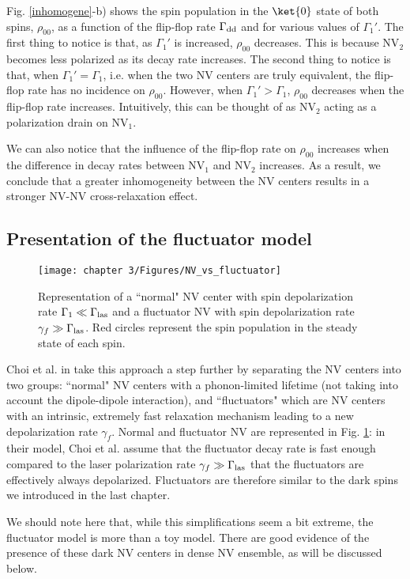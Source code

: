 \documentclass[a4paper, 11pt]{report}
\begin{document}
Fig. \ref{inhomogene}-b) shows the spin population in the $\ket{0}$ state of both spins, $\rho_{00}$, as a function of the flip-flop rate $\Gamma_{\rm dd}$ and for various values of $\Gamma_1'$. The first thing to notice is that, as $\Gamma_1'$ is increased, $\rho_{00}$ decreases. This is because NV$_2$ becomes less polarized as its decay rate increases. The second thing to notice is that, when $\Gamma_1'=\Gamma_1$, i.e. when the two NV centers are truly equivalent, the flip-flop rate has no incidence on $\rho_{00}$. However, when $\Gamma_1'>\Gamma_1$, $\rho_{00}$ decreases when the flip-flop rate increases. Intuitively, this can be thought of as NV$_2$ acting as a polarization drain on NV$_1$. 

We can also notice that the influence of the flip-flop rate on $\rho_{00}$ increases when the difference in decay rates between NV$_1$ and NV$_2$ increases. As a result, we conclude that a greater inhomogeneity between the NV centers results in a stronger NV-NV cross-relaxation effect.


\subsection{Presentation of the fluctuator model}
\begin{figure}[h]
\centering
\texttt{[image: chapter 3/Figures/NV\_vs\_fluctuator]}
\caption{Representation of a ``normal" NV center with spin depolarization rate $\Gamma_1 \ll \Gamma_{\rm las}$ and a fluctuator NV with spin depolarization rate $\gamma_f \gg \Gamma_{\rm las}$. Red circles represent the spin population in the steady state of each spin.}
\label{NV vs fluct}
\end{figure}
Choi et al. in \citep{choi2017depolarization} take this approach a step further by separating the NV centers into two groups: ``normal" NV centers with a phonon-limited lifetime (not taking into account the dipole-dipole interaction), and ``fluctuators" which are NV centers with an intrinsic, extremely fast relaxation mechanism leading to a new depolarization rate $\gamma_f$. Normal and fluctuator NV are represented in Fig. \ref{NV vs fluct}: in their model, Choi et al. assume that the fluctuator decay rate is fast enough compared to the laser polarization rate $\gamma_f \gg \Gamma_{\rm las}$ that the fluctuators are effectively always depolarized. Fluctuators are therefore similar to the dark spins we introduced in the last chapter.

We should note here that, while this simplifications seem a bit extreme, the fluctuator model is more than a toy model. There are good evidence of the presence of these dark NV centers in dense NV ensemble, as will be discussed below.
\end{document}
